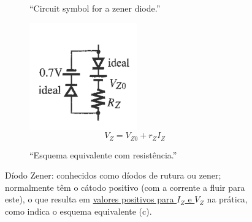 \begin{figure}[H]
\begin{subfigure}{0.45\textwidth}
{\begin{minipage}{\textwidth}
\begin{minipage}{\textwidth}
                    \caption{``Circuit symbol for a zener diode.''\cite{sedra-smith:microelectronic-circuits}}
                \end{minipage}
                \begin{minipage}{\textwidth}
                    \centering
                    \includegraphics[width=0.45\linewidth]{img/2/zener-diode-model.png}
                    $$
                        \boxed{ V_Z = V_{Z0} + r_Z I_Z }
                    $$
                    \caption{``Esquema equivalente com resistência.''\cite{medeiros:ICEE}}
                \end{minipage}
            \end{minipage}
        }
    \end{subfigure}
    \caption{Díodo Zener: conhecidos como díodos de rutura ou zener; normalmente têm o cátodo positivo (com a corrente a fluir para este), o que resulta em \underline{valores positivos para $I_Z$ e $V_Z$} na prática, como indica o esquema equivalente (c).}
    \label{fig:zener-diode}
\end{figure}


